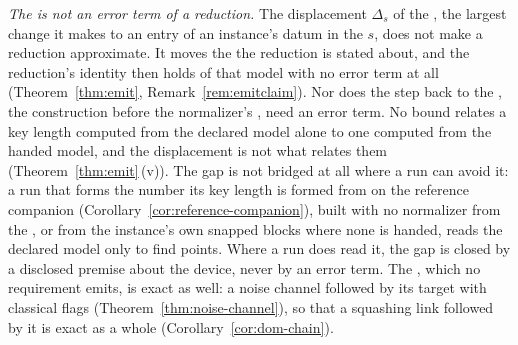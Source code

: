 \begin{remark}
\emph{The  is not an error term of a reduction.}
The displacement $\Delta_s$ of the , the largest
change it makes to an entry of an instance's datum in the 
$s$, does not make a reduction approximate. It moves the 
the reduction is stated about, and the reduction's identity then holds of that
model with no error term at all (Theorem~\ref{thm:emit},
Remark~\ref{rem:emitclaim}). Nor does the step back to the
, the construction before the normalizer's ,
need an error term. No bound relates a key length computed from the declared
model alone to one computed from the handed model, and the displacement is
not what relates them (Theorem~\ref{thm:emit}\,(v)). The gap is not bridged
at all where a run can avoid it: a run that forms the number its key length
is formed from on the reference companion
(Corollary~\ref{cor:reference-companion}), built with no normalizer from the
, or from the instance's own snapped blocks where none
is handed, reads the declared model only to find points. Where a run does read it, the gap is closed by a disclosed
premise about the device, never by an error term. The ,
which no requirement emits, is exact as well: a noise channel followed by its
target with classical flags (Theorem~\ref{thm:noise-channel}), so that a
squashing link followed by it is exact as a whole
(Corollary~\ref{cor:dom-chain}).
\end{remark}
